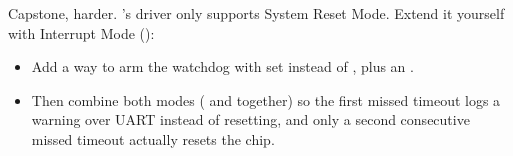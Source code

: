 \label{c8:ex:4}
Capstone, harder. 's driver only supports System Reset Mode. Extend it yourself with
Interrupt Mode ():
\begin{itemize}
  \item Add a way to arm the watchdog with  set instead of , plus an
    .
  \item Then combine both modes ( and  together) so the first missed timeout
    logs a warning over UART instead of resetting, and only a second consecutive missed timeout
    actually resets the chip.
\end{itemize}
